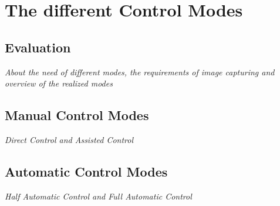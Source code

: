 
\chapter{The different Control Modes}
\label{cha:DifferentControlModes}
\section{Evaluation}
\label{sec:evaluation}
\textit{About the need of different modes, the requirements of image capturing and overview of the realized modes}
\section{Manual Control Modes}
\label{manualControlModes}
\textit{Direct Control and Assisted Control}
\section{Automatic Control Modes}
\label{automaticControlModes}
\textit{Half Automatic Control and Full Automatic Control}